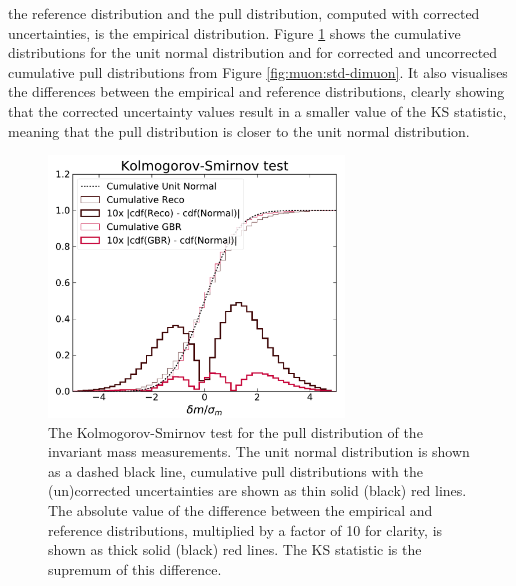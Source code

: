 the reference distribution and the pull distribution, computed with
corrected uncertainties, is the empirical distribution. Figure
\ref{fig:muon:std-ks} shows the cumulative distributions for the unit
normal distribution and for corrected and uncorrected cumulative pull
distributions from Figure \ref{fig:muon:std-dimuon}. It also visualises
the differences between the empirical and reference distributions, clearly
showing that the corrected uncertainty values result in a smaller 
value of the KS statistic, meaning that the pull distribution is closer
to the unit normal distribution.
\begin{figure}[h!]
  \centering
  \includegraphics[width=0.7\textwidth]{figures/muons/vader-std-ks}
  \caption[Kolmogorov-Smirnov statistic of the uncertainty correction]
  {The Kolmogorov-Smirnov test for the pull distribution of the invariant
  mass measurements. The unit normal distribution is shown as a dashed black
  line, cumulative pull distributions with the (un)corrected uncertainties
  are shown as thin solid (black) red lines. The absolute value of the
  difference between the empirical and reference distributions,
  multiplied by a factor of 10 for clarity, is shown as thick solid
  (black) red lines. The KS statistic is the supremum of this difference.
  }
  \label{fig:muon:std-ks}
\end{figure}

